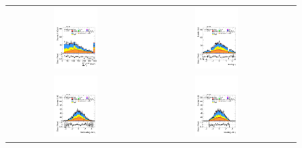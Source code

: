 \begin{figure}[htbp]
\begin{tabular}{@{}c c c@{}}
    \includegraphics[width=0.33\textwidth]{images/modelling_tmva_vars/plot_SumPtBjet_hh_tth.pdf} &
    \includegraphics[width=0.33\textwidth]{images/modelling_tmva_vars/plot_tau_0_eta_hh_tth.pdf} \\[4pt]
    \includegraphics[width=0.33\textwidth]{images/modelling_tmva_vars/plot_jet_1_eta_hh_tth.pdf} &
    \includegraphics[width=0.33\textwidth]{images/modelling_tmva_vars/plot_jet_0_eta_hh_tth.pdf} &

\end{tabular}
\end{figure}
